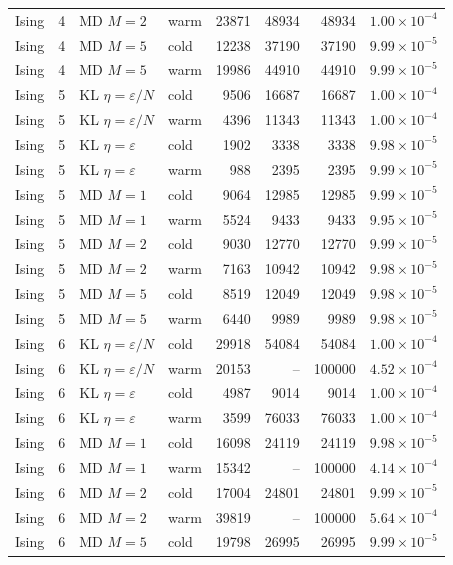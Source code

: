\begin{table}[t]
\begin{tabular}{llllrrrr}
Ising & 4 & MD $M=2$ & warm & 23871 & 48934 & 48934 & $1.00\times 10^{-4}$ \\
Ising & 4 & MD $M=5$ & cold & 12238 & 37190 & 37190 & $9.99\times 10^{-5}$ \\
Ising & 4 & MD $M=5$ & warm & 19986 & 44910 & 44910 & $9.99\times 10^{-5}$ \\
\midrule
Ising & 5 & KL $\eta=\varepsilon/N$ & cold & 9506 & 16687 & 16687 & $1.00\times 10^{-4}$ \\
Ising & 5 & KL $\eta=\varepsilon/N$ & warm & 4396 & 11343 & 11343 & $1.00\times 10^{-4}$ \\
Ising & 5 & KL $\eta=\varepsilon$ & cold & 1902 & 3338 & 3338 & $9.98\times 10^{-5}$ \\
Ising & 5 & KL $\eta=\varepsilon$ & warm & 988 & 2395 & 2395 & $9.99\times 10^{-5}$ \\
Ising & 5 & MD $M=1$ & cold & 9064 & 12985 & 12985 & $9.99\times 10^{-5}$ \\
Ising & 5 & MD $M=1$ & warm & 5524 & 9433 & 9433 & $9.95\times 10^{-5}$ \\
Ising & 5 & MD $M=2$ & cold & 9030 & 12770 & 12770 & $9.99\times 10^{-5}$ \\
Ising & 5 & MD $M=2$ & warm & 7163 & 10942 & 10942 & $9.98\times 10^{-5}$ \\
Ising & 5 & MD $M=5$ & cold & 8519 & 12049 & 12049 & $9.98\times 10^{-5}$ \\
Ising & 5 & MD $M=5$ & warm & 6440 & 9989 & 9989 & $9.98\times 10^{-5}$ \\
\midrule
Ising & 6 & KL $\eta=\varepsilon/N$ & cold & 29918 & 54084 & 54084 & $1.00\times 10^{-4}$ \\
Ising & 6 & KL $\eta=\varepsilon/N$ & warm & 20153 & -- & 100000 & $4.52\times 10^{-4}$ \\
Ising & 6 & KL $\eta=\varepsilon$ & cold & 4987 & 9014 & 9014 & $1.00\times 10^{-4}$ \\
Ising & 6 & KL $\eta=\varepsilon$ & warm & 3599 & 76033 & 76033 & $1.00\times 10^{-4}$ \\
Ising & 6 & MD $M=1$ & cold & 16098 & 24119 & 24119 & $9.98\times 10^{-5}$ \\
Ising & 6 & MD $M=1$ & warm & 15342 & -- & 100000 & $4.14\times 10^{-4}$ \\
Ising & 6 & MD $M=2$ & cold & 17004 & 24801 & 24801 & $9.99\times 10^{-5}$ \\
Ising & 6 & MD $M=2$ & warm & 39819 & -- & 100000 & $5.64\times 10^{-4}$ \\
Ising & 6 & MD $M=5$ & cold & 19798 & 26995 & 26995 & $9.99\times 10^{-5}$ \\

\end{tabular}
\end{table}
